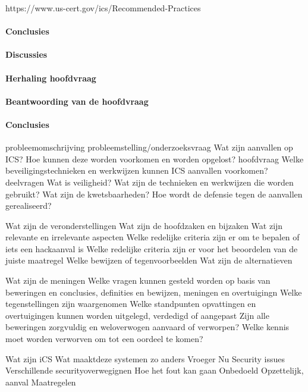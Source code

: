 {https://www.us-cert.gov/ics/Recommended-Practices
 \paragraph{Conclusies}


\paragraph{Discussies}

 \paragraph{Herhaling hoofdvraag}

 \paragraph{Beantwoording van de hoofdvraag}

 \paragraph{Conclusies}
probleemomschrijving
probleemstelling/onderzoeksvraag Wat zijn aanvallen op ICS? Hoe kunnen deze worden voorkomen
en worden opgelost?
hoofdvraag
Welke beveiligingstechnieken en werkwijzen kunnen ICS aanvallen voorkomen?
deelvragen
Wat is veiligheid?
Wat zijn de technieken en werkwijzen die worden gebruikt?
Wat zijn de kwetsbaarheden?
Hoe wordt de defensie tegen de aanvallen gerealiseerd?

Wat zijn de veronderstellingen
Wat zijn de hoofdzaken en bijzaken
Wat zijn relevante en irrelevante aspecten
Welke redelijke criteria zijn er om te bepalen of iets een hackaanval is
Welke redelijke criteria zijn er voor het beoordelen van de juiste maatregel
Welke bewijzen of tegenvoorbeelden
Wat zijn de alternatieven

Wat zijn de meningen
Welke vragen kunnen gesteld worden op basis van beweringen en conclusies, definities en bewijzen,
meningen en overtuigingn
Welke tegenstellingen zijn waargenomen
Welke standpunten opvattingen en overtuigingen kunnen worden uitgelegd, verdedigd of aangepast
Zijn alle beweringen zorgvuldig en weloverwogen aanvaard of verworpen?
Welke kennis moet worden verworven om tot een oordeel te komen?

Wat zijn iCS
Wat maaktdeze systemen zo anders
Vroeger
Nu
Security issues
Verschillende securityoverwegignen
Hoe het fout kan gaan
Onbedoeld
Opzettelijk, aanval
Maatregelen

}
